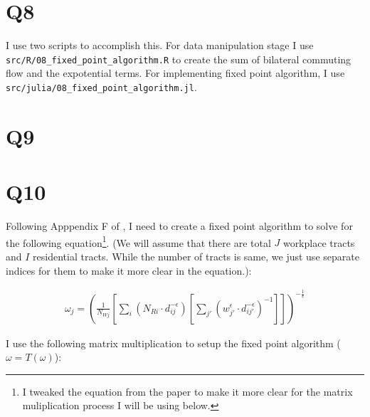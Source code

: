 \documentclass[
  11pt]{article}
\begin{document}
\section*{Q8}\label{q8}

I use two scripts to accomplish this. For data manipulation stage I use
\texttt{src/R/08\_fixed\_point\_algorithm.R} to create the sum of
bilateral commuting flow and the expotential terms. For implementing
fixed point algorithm, I use
\texttt{src/julia/08\_fixed\_point\_algorithm.jl}.

\section*{Q9}\label{q9}

\section*{Q10}\label{q10}

Following Apppendix F of \citet{brinkman2024}, I need to create a fixed
point algorithm to solve for the following equation\footnote{I tweaked
  the equation from the paper to make it more clear for the matrix
  muliplication process I will be using below.}. (We will assume that
there are total \(J\) workplace tracts and \(I\) residential tracts.
While the number of tracts is same, we just use separate indices for
them to make it more clear in the equation.):

\begin{align*}
  \omega_j = \left( \frac{1}{N_{Wj}} \left[\sum_i \left( N_{Ri} \cdot d_{ij}^{-\epsilon}\right) \left[\sum_{j'} \left( w_{j'}^\epsilon \cdot d_{ij'}^{-\epsilon} \right)^{-1}\right]\right] \right)^{-\frac{1}{\epsilon}}
\end{align*}

I use the following matrix multiplication to setup the fixed point
algorithm (\(\omega = T(\omega)\)):
\end{document}
